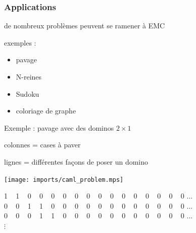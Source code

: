\documentclass{beamer}
\begin{document}

\begin{frame}\frametitle{Applications}
  de nombreux problèmes peuvent se ramener à EMC

  \bigskip
  exemples :
  \begin{itemize}
  \item pavage
  \item N-reines
  \item Sudoku
  \item coloriage de graphe
  \end{itemize}
\end{frame}


\begin{frame}{Exemple : pavage avec des dominos $2\times 1$}

  colonnes = cases à paver

  lignes = différentes façons de poser un domino

  \begin{center}
    \texttt{[image: imports/caml\_problem.mps]}
  \end{center}

  \begin{center}
    1 ~ 1 ~ 0 ~ 0 ~ 0 ~ 0 ~ 0 ~ 0 ~ 0 ~ 0 ~ 0 ~ 0 ~ 0 ~ 0 ~ 0 ~ 0 ... \\
    0 ~ 0 ~ 1 ~ 1 ~ 0 ~ 0 ~ 0 ~ 0 ~ 0 ~ 0 ~ 0 ~ 0 ~ 0 ~ 0 ~ 0 ~ 0 ... \\
    0 ~ 0 ~ 0 ~ 1 ~ 1 ~ 0 ~ 0 ~ 0 ~ 0 ~ 0 ~ 0 ~ 0 ~ 0 ~ 0 ~ 0 ~ 0 ... \\
    $\vdots$
  \end{center}
\end{frame}





\end{document}
